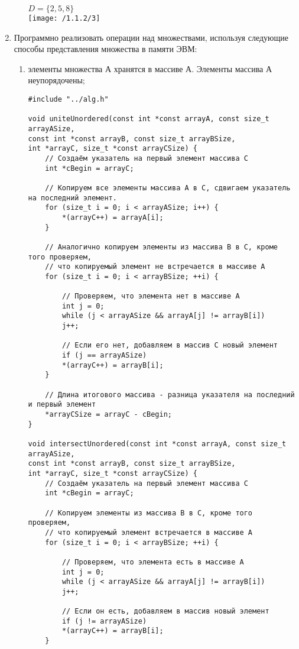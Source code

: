 \documentclass[a4paper,14pt]{extarticle}
\begin{document}
\begin{enumerate}[№1. ]
\begin{enumerate}[1.]
			$D=\{2,5,8\}$\\
			\texttt{[image: /1.1.2/3]}
		\end{enumerate}
		\item Программно реализовать операции над множествами, используя следующие способы представления множества в памяти ЭВМ:
		\begin{enumerate}[label=\asbuk*),ref=\asbuk*]
			\item элементы множества А хранятся в массиве А. Элементы массива А неупорядочены;
			\begin{verbatim}
#include "../alg.h"

void uniteUnordered(const int *const arrayA, const size_t arrayASize,
const int *const arrayB, const size_t arrayBSize,
int *arrayC, size_t *const arrayCSize) {
	// Создаём указатель на первый элемент массива С
	int *cBegin = arrayC;
	
	// Копируем все элементы массива A в C, сдвигаем указатель на последний элемент.
	for (size_t i = 0; i < arrayASize; i++) {
		*(arrayC++) = arrayA[i];
	}
	
	// Аналогично копируем элементы из массива B в C, кроме того проверяем,
	// что копируемый элемент не встречается в массиве A
	for (size_t i = 0; i < arrayBSize; ++i) {
		
		// Проверяем, что элемента нет в массиве A
		int j = 0;
		while (j < arrayASize && arrayA[j] != arrayB[i])
		j++;
		
		// Если его нет, добавляем в массив C новый элемент
		if (j == arrayASize)
		*(arrayC++) = arrayB[i];
	}
	
	// Длина итогового массива - разница указателя на последний и первый элемент
	*arrayCSize = arrayC - cBegin;
}

void intersectUnordered(const int *const arrayA, const size_t arrayASize,
const int *const arrayB, const size_t arrayBSize,
int *arrayC, size_t *const arrayCSize) {
	// Создаём указатель на первый элемент массива С
	int *cBegin = arrayC;
	
	// Копируем элементы из массива B в C, кроме того проверяем,
	// что копируемый элемент встречается в массиве A
	for (size_t i = 0; i < arrayBSize; ++i) {
		
		// Проверяем, что элемента есть в массиве A
		int j = 0;
		while (j < arrayASize && arrayA[j] != arrayB[i])
		j++;
		
		// Если он есть, добавляем в массив новый элемент
		if (j != arrayASize)
		*(arrayC++) = arrayB[i];
	}
	

\end{verbatim}
\end{enumerate}
\end{enumerate}
\end{document}

